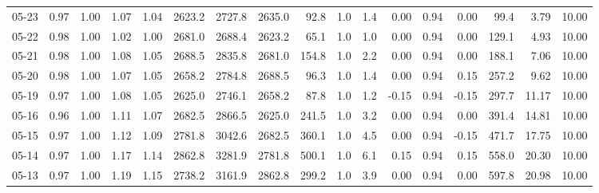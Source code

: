 \begin{threeparttable}
{\begin{tabular}{lrrrrrrrrrrrrrrrr}
  05-23 &         0.97 &           1.00 &          1.07 &          1.04 & 2623.2 & 2727.8 & 2635.0 &       92.8 &                      1.0 &                 1.4 &       0.00 &      0.94 &           0.00 &             99.4 &            3.79 &                  10.00 \\
  05-22 &         0.98 &           1.00 &          1.02 &          1.00 & 2681.0 & 2688.4 & 2623.2 &       65.1 &                      1.0 &                 1.0 &       0.00 &      0.94 &           0.00 &            129.1 &            4.93 &                  10.00 \\
  05-21 &         0.98 &           1.00 &          1.08 &          1.05 & 2688.5 & 2835.8 & 2681.0 &      154.8 &                      1.0 &                 2.2 &       0.00 &      0.94 &           0.00 &            188.1 &            7.06 &                  10.00 \\
  05-20 &         0.98 &           1.00 &          1.07 &          1.05 & 2658.2 & 2784.8 & 2688.5 &       96.3 &                      1.0 &                 1.4 &       0.00 &      0.94 &           0.15 &            257.2 &            9.62 &                  10.00 \\
  05-19 &         0.97 &           1.00 &          1.08 &          1.05 & 2625.0 & 2746.1 & 2658.2 &       87.8 &                      1.0 &                 1.2 &      -0.15 &      0.94 &          -0.15 &            297.7 &           11.17 &                  10.00 \\
  05-16 &         0.96 &           1.00 &          1.11 &          1.07 & 2682.5 & 2866.5 & 2625.0 &      241.5 &                      1.0 &                 3.2 &       0.00 &      0.94 &           0.00 &            391.4 &           14.81 &                  10.00 \\
  05-15 &         0.97 &           1.00 &          1.12 &          1.09 & 2781.8 & 3042.6 & 2682.5 &      360.1 &                      1.0 &                 4.5 &       0.00 &      0.94 &          -0.15 &            471.7 &           17.75 &                  10.00 \\
  05-14 &         0.97 &           1.00 &          1.17 &          1.14 & 2862.8 & 3281.9 & 2781.8 &      500.1 &                      1.0 &                 6.1 &       0.15 &      0.94 &           0.15 &            558.0 &           20.30 &                  10.00 \\
  05-13 &         0.97 &           1.00 &          1.19 &          1.15 & 2738.2 & 3161.9 & 2862.8 &      299.2 &                      1.0 &                 3.9 &       0.00 &      0.94 &           0.00 &            597.8 &           20.98 &                  10.00 \\

\end{tabular}}
\end{threeparttable}
